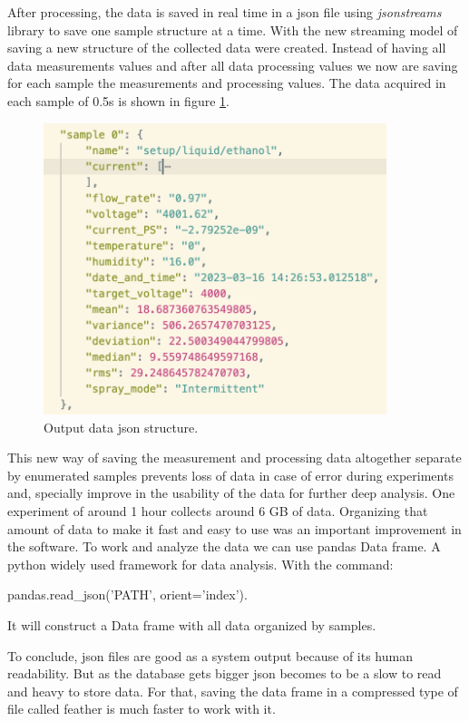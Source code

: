         After processing, the data is saved in real time in a json file using \emph{jsonstreams} library to save one sample structure at a time.
        With the new streaming model of saving a new structure of the collected data were created.
        Instead of having all data measurements values and after all data processing values we now are saving for each sample the measurements and processing values.
        The data acquired in each sample of 0.5s is shown in figure \ref{fig:data_sample}.
    
        \begin{figure}[H]
            \center
            \includegraphics[width=10cm]{Figuras/19:03/new_sample.png}
            \caption{Output data json structure.}
            \label{fig:data_sample}
        \end{figure}
    
        This new way of saving the measurement and processing data altogether separate by enumerated samples prevents loss of data in case of error during experiments and, specially improve in the usability of the data for further deep analysis. One experiment of around 1 hour collects around 6 GB of data. Organizing that amount of data to make it fast and easy to use was an important improvement in the software.
        To work and analyze the data we can use  pandas Data frame. A python widely used framework for data analysis.
        With the command:
        
        pandas.read\_json('PATH', orient='index').

        It will construct a Data frame with all data organized by samples.
    
        To conclude, json files are good as a system output because of its human readability. But as the database gets bigger json becomes to be a slow to read and heavy to store data. For that, saving the data frame in a compressed type of file called feather is much faster to work with it.
    

